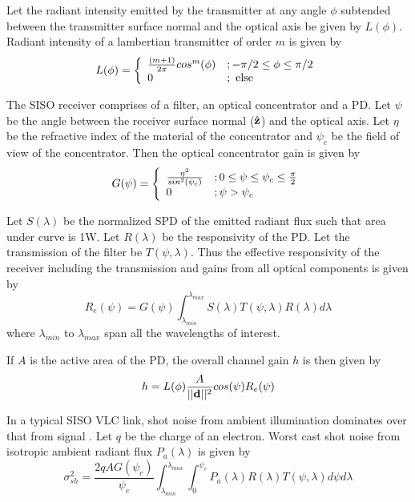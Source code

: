 Let the radiant intensity emitted by the transmitter at any angle $\phi$ subtended between the transmitter surface normal and the optical axis be given by $L(\phi)$. Radiant intensity of a lambertian transmitter of order $m$ is given by
\begin{equation}
	\label{eqLambertian}
	L(\phi) = \left\{ \begin{array}{ll} {\frac{(m+1)}{2\pi}}cos^{m}(\phi) &; -\pi/2\leq\phi\leq\pi/2 \\ 0 &; \mbox{ else} \end{array} \right.
\end{equation}

The SISO receiver comprises of a filter, an optical concentrator and a PD. Let $\psi$ be the angle between the receiver surface normal ($\hat{\bf{z}}$) and the optical axis. Let $\eta$ be the refractive index of the material of the concentrator and $\psi_{c}$ be the field of view of the concentrator. Then the optical concentrator gain is given by
\begin{equation}
	\label{eqOpGain}
	G(\psi) = \left\{ \begin{array}{ll} \frac{\eta^{2}}{sin^{2}(\psi_{c})} &; 0\leq\psi\leq\psi_{c}\leq\frac{\pi}{2} \\ 0 &; \psi>\psi_{c} \end{array} \right.
\end{equation}

Let $S(\lambda)$ be the normalized SPD of the emitted radiant flux such that area under curve is 1W. Let $R(\lambda)$ be the responsivity of the PD. Let the transmission of the filter be $T(\psi,\lambda)$. Thus the effective responsivity of the receiver including the transmission and gains from all optical components is given by 
\begin{equation}
	\label{eqReff}
	R_{e}(\psi) = G(\psi)\int^{\lambda_{max}}_{\lambda_{min}}S(\lambda)T(\psi,\lambda)R(\lambda)d\lambda
\end{equation}
where $\lambda_{min}$ to $\lambda_{max}$ span all the wavelengths of interest.

If $A$ is the active area of the PD, the overall channel gain $h$ is then given by
\begin{equation}
	\label{eqChGain}
	h = L(\phi)\frac{A}{||{\bf{d}}||^{2}}cos(\psi)R_{e}(\psi)
\end{equation}

In a typical SISO VLC link, shot noise from ambient illumination dominates over that from signal \cite{bar94a}. Let $q$ be the charge of an electron. Worst cast shot noise from isotropic ambient radiant flux $P_{a}(\lambda)$ is given by
\begin{equation}
	\label{eqNshot}
	\sigma_{sh}^{2} = \frac{2qAG(\psi_{c})}{\psi_{c}}\int_{\lambda_{min}}^{\lambda_{max}}\int_{0}^{\psi_{c}}P_{a}(\lambda)R(\lambda)T(\psi,\lambda)d\psi d\lambda
\end{equation}

